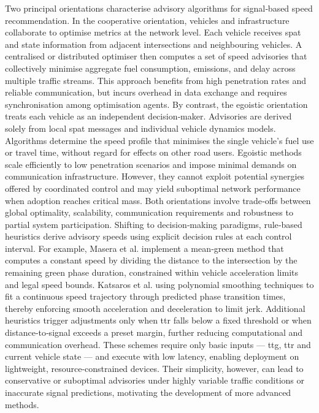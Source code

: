Two principal orientations characterise advisory algorithms for signal‐based speed recommendation. In the cooperative orientation, vehicles and infrastructure collaborate to optimise metrics at the network level. Each vehicle receives \ac{spat} and state information from adjacent intersections and neighbouring vehicles. A centralised or distributed optimiser then computes a set of speed advisories that collectively minimise aggregate fuel consumption, emissions, and delay across multiple traffic streams. This approach benefits from high penetration rates and reliable communication, but incurs overhead in data exchange and requires synchronisation among optimisation agents.
By contrast, the egoistic orientation treats each vehicle as an independent decision‐maker. Advisories are derived solely from local \ac{spat} messages and individual vehicle dynamics models. Algorithms determine the speed profile that minimises the single vehicle’s fuel use or travel time, without regard for effects on other road users. Egoistic methods scale efficiently to low penetration scenarios and impose minimal demands on communication infrastructure. However, they cannot exploit potential synergies offered by coordinated control and may yield suboptimal network performance when adoption reaches critical mass.
Both orientations involve trade‐offs between global optimality, scalability, communication requirements and robustness to partial system participation.  
\mynewline
Shifting to decision‐making paradigms, rule‐based heuristics derive advisory speeds using explicit decision rules at each control interval. For example, Masera et al. \cite{Masera2019} implement a mean‐green method that computes a constant speed by dividing the distance to the intersection by the remaining green phase duration, constrained within vehicle acceleration limits and legal speed bounds. Katsaros et al. \cite{Katsaros2011} using polynomial smoothing techniques to fit a continuous speed trajectory through predicted phase transition times, thereby enforcing smooth acceleration and deceleration to limit jerk. Additional heuristics trigger adjustments only when \ac{ttr} falls below a fixed threshold or when distance‐to‐signal exceeds a preset margin, further reducing computational and communication overhead. These schemes require only basic inputs --- \ac{ttg}, \ac{ttr} and current vehicle state --- and execute with low latency, enabling deployment on lightweight, resource‐constrained devices. Their simplicity, however, can lead to conservative or suboptimal advisories under highly variable traffic conditions or inaccurate signal predictions, motivating the development of more advanced methods.









